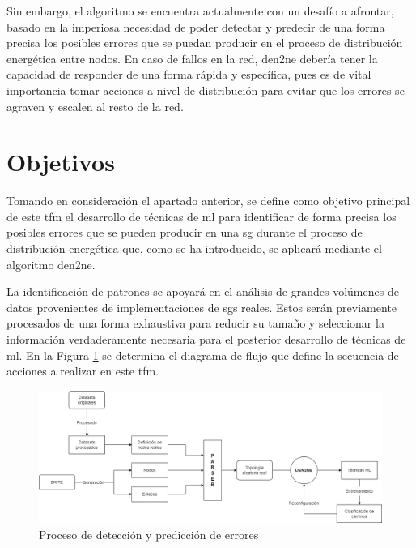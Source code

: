 
\pagebreak

Sin embargo, el algoritmo se encuentra actualmente con un desafío a afrontar, basado en la imperiosa necesidad de poder detectar y predecir de una forma precisa los posibles errores que se puedan producir en el proceso de distribución energética entre nodos. En caso de fallos en la red, \gls{den2ne} debería tener la capacidad de responder de una forma rápida y específica, pues es de vital importancia tomar acciones a nivel de distribución para evitar que los errores se agraven y escalen al resto de la red.

\vspace{3mm}



\section{Objetivos}
\label{sec:obj}

Tomando en consideración el apartado anterior, se define como objetivo principal de este \gls{tfm} el desarrollo de técnicas de \gls{ml} para identificar de forma precisa los posibles errores que se pueden producir en una \gls{sg} durante el proceso de distribución energética que, como se ha introducido, se aplicará mediante el algoritmo \gls{den2ne}. 

\vspace{3mm}

La identificación de patrones se apoyará en el análisis de grandes volúmenes de datos provenientes de implementaciones de \gls{sg}s reales. Estos serán previamente procesados de una forma exhaustiva para reducir su tamaño y seleccionar la información verdaderamente necesaria para el posterior desarrollo de técnicas de \gls{ml}. En la Figura \ref{fig:intro} se determina el diagrama de flujo que define la secuencia de acciones a realizar en este \gls{tfm}.

\vspace{4mm}

\begin{figure}[h!]
    \centering
    \includegraphics[width=1\textwidth]{img/intro/anteproyecto.drawio.png}
    \caption{Proceso de detección y predicción de errores}
    \label{fig:intro}
\end{figure}

